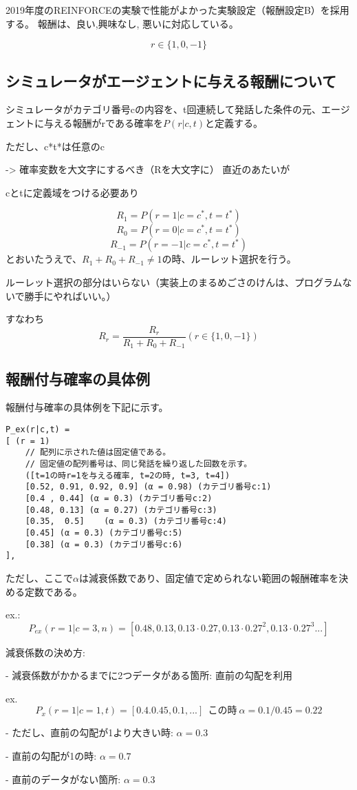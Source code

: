 \documentclass[11pt,a4paper]{jsarticle}
\begin{document}
2019年度のREINFORCEの実験で性能がよかった実験設定（報酬設定B）を採用する。
報酬は、{良い,興味なし, 悪い}に対応している。

$$
r \in \{1, 0, -1\}
$$

\subsection{シミュレータがエージェントに与える報酬について}

シミュレータがカテゴリ番号cの内容を、t回連続して発話した条件の元、エージェントに与える報酬がrである確率を$P(r|c,t)$と定義する。

ただし、c*t*は任意のc

-> 確率変数を大文字にするべき（Rを大文字に）
直近のあたいが

cとtに定義域をつける必要あり

$$
R_1 =  P(r=1|c = c^*, t=t^*)
$$
$$
R_0 = P(r=0|c = c^*, t=t^*)
$$
$$
R_{-1} = P(r=-1|c = c^*, t=t^*)
$$
とおいたうえで、$R_1 + R_0 + R_{-1} \neq 1$の時、ルーレット選択を行う。

ルーレット選択の部分はいらない（実装上のまるめごさのけんは、プログラムないで勝手にやればいい。）

すなわち
$$
R_r = \frac{R_r}{R_1 + R_0 + R_{-1}} (r \in \{1, 0, -1\})
$$

\subsection{報酬付与確率の具体例}
報酬付与確率の具体例を下記に示す。
\begin{lstlisting}
P_ex(r|c,t) =
[ (r = 1)
    // 配列に示された値は固定値である。
    // 固定値の配列番号は、同じ発話を繰り返した回数を示す。
    ([t=1の時r=1を与える確率, t=2の時, t=3, t=4])
    [0.52, 0.91, 0.92, 0.9] (α = 0.98) (カテゴリ番号c:1)
    [0.4 , 0.44] (α = 0.3) (カテゴリ番号c:2)
    [0.48, 0.13] (α = 0.27) (カテゴリ番号c:3)	
    [0.35,	0.5]	(α = 0.3) (カテゴリ番号c:4)
    [0.45] (α = 0.3) (カテゴリ番号c:5)
    [0.38] (α = 0.3) (カテゴリ番号c:6)
],
\end{lstlisting}

ただし、ここで$\alpha$は減衰係数であり、固定値で定められない範囲の報酬確率を決める定数である。\par
ex.: 
$$
P_{ex}(r=1|c=3, n) = [0.48, 0.13, 0.13\cdot0.27, 0.13\cdot0.27^2, 0.13\cdot0.27^3...]
$$

減衰係数の決め方:

- 減衰係数がかかるまでに2つデータがある箇所: 直前の勾配を利用\par
ex.
$$
P_{x}(r=1|c=1,t) = [0.4.0.45,0.1, ...]\ \ この時\ \alpha=0.1/0.45=0.22
$$
\par
- ただし、直前の勾配が1より大きい時: $\alpha=0.3$ \par
- 直前の勾配が1の時: $\alpha=0.7$  \par
- 直前のデータがない箇所: $\alpha=0.3$  \par
\end{document}

